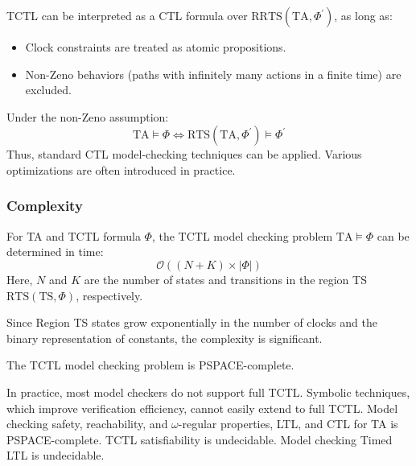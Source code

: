 TCTL can be interpreted as a CTL formula over R$\text{RTS}(\text{TA},\Phi^\prime)$, as long as:
\begin{itemize}
    \item Clock constraints are treated as atomic propositions.
    \item Non-Zeno behaviors (paths with infinitely many actions in a finite time) are excluded.
\end{itemize}
\noindent Under the non-Zeno assumption:
\[\text{TA}\models\Phi\Leftrightarrow\text{RTS}(\text{TA},\Phi^\prime)\models\Phi^\prime\]
\noindent Thus, standard CTL model-checking techniques can be applied. Various optimizations are often introduced in practice.

\subsubsection{Complexity}
\begin{theorem}
    For TA and TCTL formula $\Phi$, the TCTL model checking problem $\text{TA}\models\Phi$ can be determined in time: 
    \[\mathcal{O}((N+K)\times\left\lvert \Phi\right\rvert )\] 
    Here, $N$ and $K$ are the number of states and transitions in the region TS $\text{RTS}(\text{TS},\Phi)$, respectively. 
\end{theorem}
\noindent Since Region TS states grow exponentially in the number of clocks and the binary representation of constants, the complexity is significant.
\begin{theorem}
    The TCTL model checking problem is PSPACE-complete.
\end{theorem}

In practice, most model checkers do not support full TCTL.
Symbolic techniques, which improve verification efficiency, cannot easily extend to full TCTL.
Model checking safety, reachability, and $\omega$-regular properties, LTL, and CTL for TA is PSPACE-complete.
TCTL satisfiability is undecidable.
Model checking Timed LTL is undecidable.